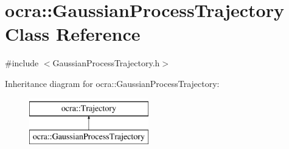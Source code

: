 \hypertarget{classocra_1_1GaussianProcessTrajectory}{}\section{ocra\+:\+:Gaussian\+Process\+Trajectory Class Reference}
\label{classocra_1_1GaussianProcessTrajectory}


{\ttfamily \#include $<$Gaussian\+Process\+Trajectory.\+h$>$}

Inheritance diagram for ocra\+:\+:Gaussian\+Process\+Trajectory\+:\begin{figure}[H]
\begin{center}
\leavevmode
\includegraphics[height=2.000000cm]{d9/d69/classocra_1_1GaussianProcessTrajectory}
\end{center}
\end{figure}
